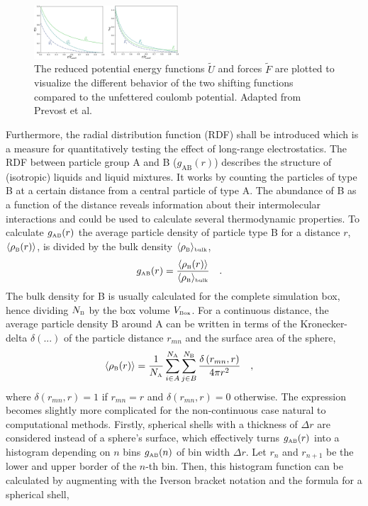 \documentclass[9pt,tutorial]{livecoms}
\begin{document}
\begin{figure}
    \centering
    \includegraphics[width=0.48\textwidth]{figures/PotentialShifting.png}
    \caption{The reduced potential energy functions $\widetilde{U}$ and forces $\widetilde{F}$ are plotted to visualize the different behavior of the two shifting functions compared to the unfettered coulomb potential. Adapted from Prevost et al.\cite{Prevost1990}}
    \label{fig:PotentialShifting}
\end{figure}
Furthermore, the radial distribution function (RDF) shall be introduced which is a measure for quantitatively testing the effect of long-range electrostatics. The RDF between particle group A and B ($g_\text{AB}(r)$) describes the structure of (isotropic) liquids and liquid mixtures. It works by counting the particles of type B at a certain distance from a central particle of type A. The abundance of B as a function of the distance reveals information about their intermolecular interactions and could be used to calculate several thermodynamic properties. To calculate $g_\text{\tiny AB}(r)$ the average particle density of particle type B for a distance $r$, $\langle \rho_\text{\tiny B}(r)\rangle$, is divided by the bulk density $\langle \rho_\text{\tiny B} \rangle_\text{\tiny bulk}$,
\begin{align} \label{eq:gab_simple}
    g_\text{\tiny AB}(r) & = \frac{\langle \rho_\text{\tiny B}(r)\rangle}{\langle \rho_\text{\tiny B} \rangle_\text{\tiny bulk}} \quad .
\end{align}
The bulk density for B is usually calculated for the complete simulation box, hence dividing $N_\text{\tiny B}$ by the box volume $V_\text{\tiny Box}$. For a continuous distance, the average particle density B around A can be written in terms of the Kronecker-delta $\delta (...)$ of the particle distance $r_{mn}$ and the surface area of the sphere,
\begin{align} \label{eq:rhoABr}
    \langle \rho_\text{\tiny B}(r) \rangle & = \frac{1}{N_\text{\tiny A}} \sum_{i \in A}^{N_\text{\tiny A}} \sum_{j \in B}^{N_\text{\tiny B}} \frac{\delta\left(r_{mn},r\right)}{4 \pi r^2} \quad ,
\end{align}
where $\delta(r_{mn},r)=1$ if $r_{mn} = r$ and $\delta(r_{mn},r)=0$ otherwise.
The expression becomes slightly more complicated for the non-continuous case natural to computational methods. Firstly, spherical shells with a thickness of $\Delta r$ are considered instead of a sphere's surface, which effectively turns $g_\text{\tiny AB}(r)$ into a histogram depending on $n$ bins $g_\text{\tiny AB}(n)$ of bin width $\Delta r$. Let $r_n$ and $r_{n+1}$ be the lower and upper border of the $n$-th bin. Then, this histogram function can be calculated by augmenting  with the Iverson bracket notation and the formula for a spherical shell,
\end{document}
